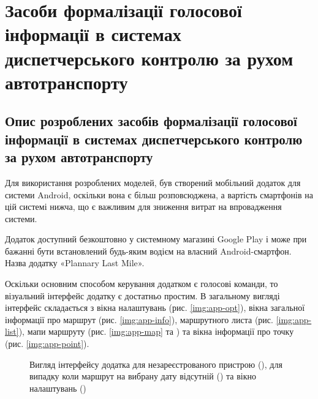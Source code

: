 \chapter{Засоби формалізації голосової інформації в системах диспетчерського контролю за рухом автотранспорту} \label{chapt4}

\section{Опис розроблених засобів формалізації голосової інформації в системах диспетчерського контролю за рухом автотранспорту} \label{sect4_0}

Для використання розроблених моделей, був створений мобільний додаток для системи Android, оскільки вона є більш розповсюджена, а вартість смартфонів на цій системі нижча, що є важливим для зниження витрат на впровадження системи.

Додаток доступний безкоштовно у системному магазині Google Play і може при бажанні бути встановлений будь-яким водієм на власний Android-смартфон. Назва додатку «Plannary Last Mile».

Оскільки основним способом керування додатком є голосові команди, то візуальний інтерфейс додатку є достатньо простим. В загальному вигляді інтерфейс складається з вікна налаштувань (рис. \ref{img:app-opt}), вікна загальної інформації про маршрут (рис. \ref{img:app-info}), маршрутного листа (рис. \ref{img:app-list}), мапи маршруту (рис. \ref{img:app-map} та ) та вікна інформації про точку (рис. \ref{img:app-point}).

\begin{figure}
	\centering
	\hspace{0pt plus1fill}
	\hspace{0pt plus2fill}
	\hspace{0pt plus2fill}
	\hspace{0pt plus1fill}
	\caption{Вигляд інтерфейсу додатка для незареєстрованого пристрою (), для випадку коли маршрут на вибрану дату відсутній () та вікно налаштувань ()}
	\label{img:app-base}
\end{figure}

